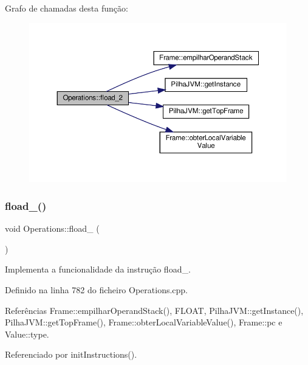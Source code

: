 Grafo de chamadas desta função\+:
\nopagebreak
\begin{figure}[H]
\begin{center}
\leavevmode
\includegraphics[width=350pt]{classOperations_a1d1767084d543ab73c8417efe11e195e_cgraph}
\end{center}
\end{figure}
\mbox{\label{classOperations_a1d7d4685fea35e0619ff468ed57a4f94}} 
\subsubsection{\texorpdfstring{fload\+\_()}{fload\_3()}}
{\footnotesize\ttfamily void Operations\+::fload\+\_ (\begin{DoxyParamCaption}{ }\end{DoxyParamCaption})\hspace{0.3cm}{\ttfamily [private]}}



Implementa a funcionalidade da instrução fload\+\_. 



Definido na linha 782 do ficheiro Operations.\+cpp.



Referências Frame\+::empilhar\+Operand\+Stack(), F\+L\+O\+AT, Pilha\+J\+V\+M\+::get\+Instance(), Pilha\+J\+V\+M\+::get\+Top\+Frame(), Frame\+::obter\+Local\+Variable\+Value(), Frame\+::pc e Value\+::type.



Referenciado por init\+Instructions().

